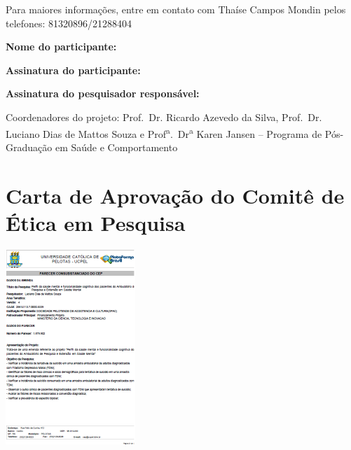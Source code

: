 \documentclass[chapter=TITLE,
               oneside,
               12pt,
               a4paper,
               english,
               brazil]{abntex2}    %
\begin{document}
\begin{anexosenv}
{\begin{enumerate}
            \end{enumerate}

        Para maiores informações, entre em contato com Thaíse Campos Mondin pelos
        telefones: 81320896/21288404

        \textbf{Nome do participante:} \hrulefill

        \textbf{Assinatura do participante:} \hrulefill

        \textbf{Assinatura do pesquisador responsável:} \hrulefill

        Coordenadores do projeto: Prof.~Dr. Ricardo Azevedo da Silva, Prof.~Dr.
        Luciano Dias de Mattos Souza e Prof\textsuperscript{a}.~Dr\textsuperscript{a}
        Karen Jansen -- Programa de Pós-Graduação em Saúde e Comportamento

        }

    \chapter{Carta de Aprovação do Comitê de Ética em Pesquisa}
        
        \begin{center}
        \includegraphics[width=.9\textwidth]{img/cartacep01.pdf}
        \end{center}


\end{anexosenv}
\end{document}
